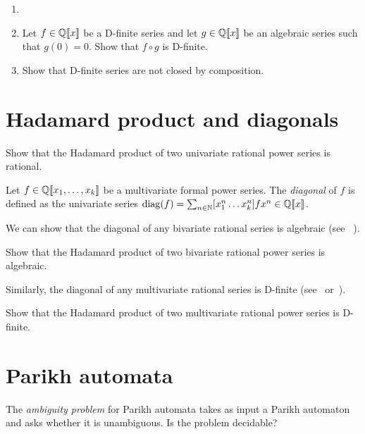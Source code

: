 \begin{exercise}
    \begin{enumerate}
        \item[]
        \item Let $f \in \mathbb Q[\![x]\!]$ be a D-finite series
            and let $g \in \mathbb Q[\![x]\!]$ be an algebraic
            series such that $g(0) = 0$.
            Show that $f \circ g$ is D-finite.
        \item Show that D-finite series are not closed by composition.
    \end{enumerate}
\end{exercise}

\section*{Hadamard product and diagonals}

\begin{exercise}
    Show that the Hadamard product of two univariate rational power
    series is rational.
\end{exercise}

Let $f \in \mathbb Q[\![x_1, \dots, x_k]\!]$ be a multivariate
formal power series.
The \emph{diagonal} of $f$ is defined as the univariate series $\mathrm{diag}(f)
= \sum_{n \in \mathbb N} [x_1^n \dots x_k^n]f x^n \in \mathbb Q[\![x]\!]$.

We can show that the diagonal of any bivariate rational series is
algebraic (see \eg~\cite[Theorem 6.3.3]{Sta2023}).

\begin{exercise}
    Show that the Hadamard product of two bivariate rational power
    series is algebraic.
\end{exercise}

Similarly, the diagonal of any multivariate rational series is
D-finite (see~\cite{Lipshitz:JA:1988} or~\cite[Theorem 5.33]{Kauers:D-finite:2023}).

\begin{exercise}
    Show that the Hadamard product of two multivariate rational power
    series is D-finite.
\end{exercise}

\section*{Parikh automata}

\begin{exercise}
    The \emph{ambiguity problem} for Parikh automata takes as input a
    Parikh automaton
    and asks whether it is unambiguous.
    Is the problem decidable?
\end{exercise}




